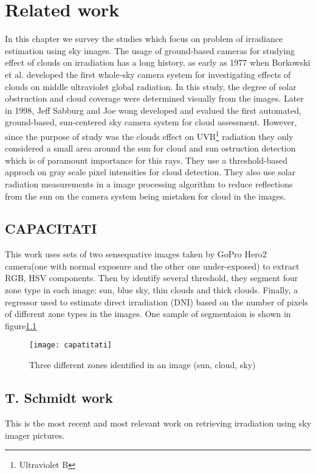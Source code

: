 \chapter{Related work}
In this chapter we survey the studies which focus on problem of irradiance estimation using sky images. The usage of ground-based cameras for studying effect of clouds on irradiation has a long history, as early as 1977 when Borkowski et al.\cite{Borkowski1977} developed the first whole-sky camera system for investigating effects of clouds on middle ultraviolet global radiation. In this study, the degree of solar obstruction and cloud coverage were determined visually from the images. Later in 1998, Jeff Sabburg and Joe wong\cite{Sabburg1998} developed and evalued the first automated, ground-based, sun-centered sky camera system for cloud assessment. However, since the purpose of study was the clouds effect on UVB\footnote{Ultraviolet B} radiation they only considered a small area around the sun for cloud and sun ostruction detection which is of paramount importance for this rays. They use a threshold-based approch on gray scale pixel intensities for cloud detection. They also use solar radiation measurements in a image processing algorithm to reduce reflections from the sun on the camera system being mistaken for cloud in the images.

\section{CAPACITATI}
This work uses sets of two sensequative images  taken by GoPro Hero2 camera(one with normal exposure and the other one under-exposed) to extract RGB, HSV components. Then by identify several threshold, they segment four zone type in each image: sun, blue sky, thin clouds and thick clouds. Finally, a regressor used to estimate direct irradiation (DNI) based on the number of pixels of different zone types in the images. One sample of segmentaion is shown in figure\ref{fig:capatitati}

\begin{figure}[h]
\caption{Three different zones identified in an image (sun, cloud, sky)}
\label{fig:capatitati}
\texttt{[image: capatitati]}
\centering
\end{figure} 

\section{T. Schmidt work}
This\cite{tSchmidt15} is the most recent and most relevant work on retrieving irradiation using sky imager pictures.
